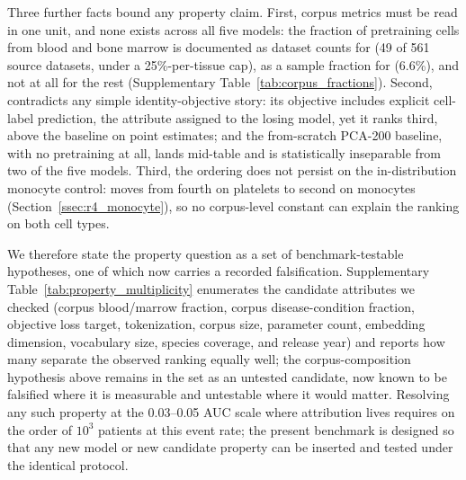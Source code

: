 Three further facts bound any property claim. First, corpus metrics must be
read in one unit, and none exists across all five models: the fraction of
pretraining cells from blood and bone marrow is documented as dataset counts
for  (49 of 561 source datasets, under a 25\%-per-tissue
cap), as a sample fraction for  (6.6\%), and not at all for the
rest (Supplementary Table~\ref{tab:corpus_fractions}). Second,
 contradicts any simple identity-objective story: its
objective includes explicit cell-label prediction, the attribute assigned to
the losing model, yet it ranks third, above the baseline on point estimates;
and the from-scratch PCA-200 baseline, with no pretraining at all, lands
mid-table and is statistically inseparable from two of the five models.
Third, the ordering does not persist on the in-distribution monocyte control:
 moves from fourth on platelets to second on monocytes
(Section~\ref{ssec:r4_monocyte}), so no corpus-level constant can explain the
ranking on both cell types.

We therefore state the property question as a set of benchmark-testable
hypotheses, one of which now carries a recorded falsification. Supplementary
Table~\ref{tab:property_multiplicity} enumerates the candidate attributes we
checked (corpus blood/marrow fraction, corpus disease-condition fraction,
objective loss target, tokenization, corpus size, parameter count, embedding
dimension, vocabulary size, species coverage, and release year) and reports
how many separate the observed ranking equally well; the corpus-composition
hypothesis above remains in the set as an untested candidate, now known to be
falsified where it is measurable and untestable where it would matter.
Resolving any such property at the 0.03--0.05 AUC scale where attribution
lives requires on the order of $10^3$ patients at this event rate; the
present benchmark is designed so that any new model or new candidate property
can be inserted and tested under the identical protocol.
